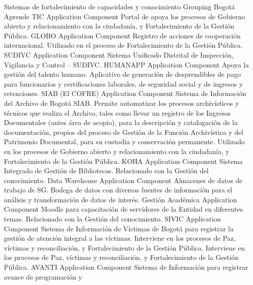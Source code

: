 \documentclass[
	a4paper, %
	12pt, %
]{include/CSSullivanBusinessReport}
\begin{document}
\textbar{} \textbar{} Sistemas de fortalecimiento de capacidades y
conocimiento \textbar{} Grouping \textbar{} \textbar{} \textbar{} Bogotá
Aprende TIC \textbar{} Application Component \textbar{} Portal de apoya
los procesos de Gobierno abierto y relacionamiento con la ciudadanía, y
Fortalecimiento de la Gestión Pública. \textbar{} \textbar{} GLOBO
\textbar{} Application Component \textbar{} Registro de acciones de
cooperación internacional. Utilizado en el proceso de Fortalecimiento de
la Gestión Pública. \textbar{} \textbar{} SUDIVC \textbar{} Application
Component \textbar{} Sistema Unificado Distrital de Inspección,
Vigilancia y Control -- SUDIVC. \textbar{} \textbar{} HUMANAPP
\textbar{} Application Component \textbar{} Apoya la gestión del talento
humano. Aplicativo de generación de desprendibles de pago para
funcionarios y certificaciones laborales, de seguridad social y de
ingresos y retenciones. \textbar{} \textbar{} SIAB (El COFRE) \textbar{}
Application Component \textbar{} Sistema de Información del Archivo de
Bogotá SIAB. Permite automatizar los procesos archivísticos y técnicos
que realiza el Archivo, tales como llevar un registro de los Ingresos
Documentales (antes área de acopio), para la descripción y catalogación
de la documentación, propios del proceso de Gestión de la Función
Archivística y del Patrimonio Documental, para su custodia y
conservación permanente. Utilizado en los procesos de Gobierno abierto y
relacionamiento con la ciudadanía, y Fortalecimiento de la Gestión
Pública. \textbar{} \textbar{} KOHA \textbar{} Application Component
\textbar{} Sistema Integrado de Gestión de Bibliotecas. Relacionado con
la Gestión del conocimiento. \textbar{} \textbar{} Data Warehouse
\textbar{} Application Component \textbar{} Almacenes de datos de
trabajo de SG. Bodega de datos con diversas fuentes de información para
el análisis y transformación de datos de interés. \textbar{} \textbar{}
Gestión Académica \textbar{} Application Component \textbar{} Moodle
para capacitación de servidores de la Entidad en diferentes temas.
Relacionado con la Gestión del conocimiento. \textbar{} \textbar{} SIVIC
\textbar{} Application Component \textbar{} Sistema de Información de
Víctimas de Bogotá para registrar la gestión de atención integral a las
víctimas. Interviene en los procesos de Paz, víctimas y reconciliación,
y Fortalecimiento de la Gestión Pública. Interviene en los procesos de
Paz, víctimas y reconciliación, y Fortalecimiento de la Gestión Pública.
\textbar{} \textbar{} AVANTI \textbar{} Application Component \textbar{}
Sistema de Información para registrar avance de programación y
\end{document}

